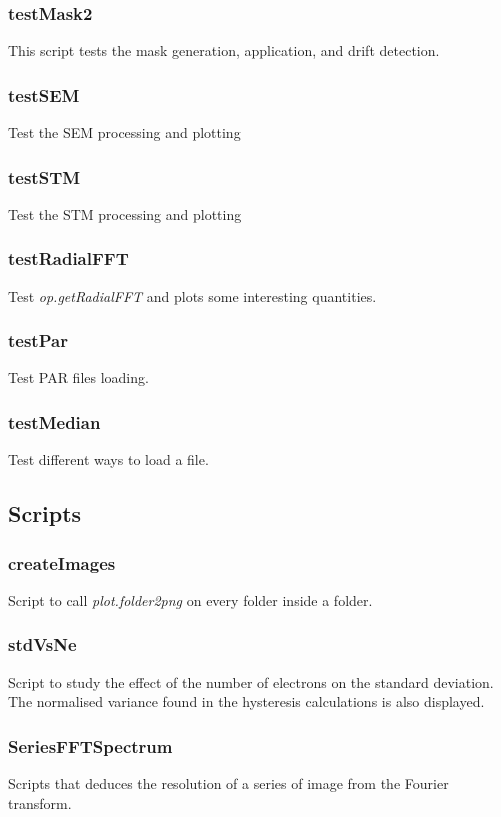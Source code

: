 \subsubsection{testMask2}
This script tests the mask generation, application, and drift detection.

\subsubsection{testSEM}
Test the SEM processing and plotting

\subsubsection{testSTM}
Test the STM processing and plotting

\subsubsection{testRadialFFT}
Test \emph{op.getRadialFFT} and plots some interesting quantities.

\subsubsection{testPar}
Test PAR files loading.

\subsubsection{testMedian}
Test different ways to load a file.

\subsection{Scripts}

\subsubsection{createImages}
Script to call \emph{plot.folder2png} on every folder inside a folder.

\subsubsection{stdVsNe}
Script to study the effect of the number of electrons on the standard deviation. The normalised variance found in the hysteresis calculations is also displayed.

\subsubsection{SeriesFFTSpectrum}
Scripts that deduces the resolution of a series of image from the Fourier transform.

